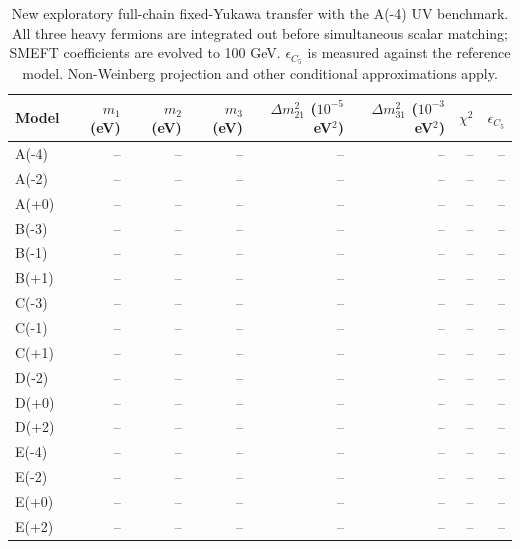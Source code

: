 \begin{table}[htbp]
\centering
\small
\setlength{\tabcolsep}{3.4pt}
\begin{tabular}{lrrrrrrr}
\hline
Model & $m_1$ (eV) & $m_2$ (eV) & $m_3$ (eV) & $\Delta m^2_{21}$ ($10^{-5}$ eV$^2$) & $\Delta m^2_{31}$ ($10^{-3}$ eV$^2$) & $\chi^2$ & $\epsilon_{C_5}$ \\
\hline
A(-4) & -- & -- & -- & -- & -- & -- & -- \\
A(-2) & -- & -- & -- & -- & -- & -- & -- \\
A(+0) & -- & -- & -- & -- & -- & -- & -- \\
B(-3) & -- & -- & -- & -- & -- & -- & -- \\
B(-1) & -- & -- & -- & -- & -- & -- & -- \\
B(+1) & -- & -- & -- & -- & -- & -- & -- \\
C(-3) & -- & -- & -- & -- & -- & -- & -- \\
C(-1) & -- & -- & -- & -- & -- & -- & -- \\
C(+1) & -- & -- & -- & -- & -- & -- & -- \\
D(-2) & -- & -- & -- & -- & -- & -- & -- \\
D(+0) & -- & -- & -- & -- & -- & -- & -- \\
D(+2) & -- & -- & -- & -- & -- & -- & -- \\
E(-4) & -- & -- & -- & -- & -- & -- & -- \\
E(-2) & -- & -- & -- & -- & -- & -- & -- \\
E(+0) & -- & -- & -- & -- & -- & -- & -- \\
E(+2) & -- & -- & -- & -- & -- & -- & -- \\
\hline
\end{tabular}
\caption{New exploratory full-chain fixed-Yukawa transfer with the A(-4) UV benchmark. All three heavy fermions are integrated out before simultaneous scalar matching; SMEFT coefficients are evolved to 100 GeV. $\epsilon_{C_5}$ is measured against the reference model. Non-Weinberg projection and other conditional approximations apply.}
\label{tab:generalised_b2}
\end{table}
